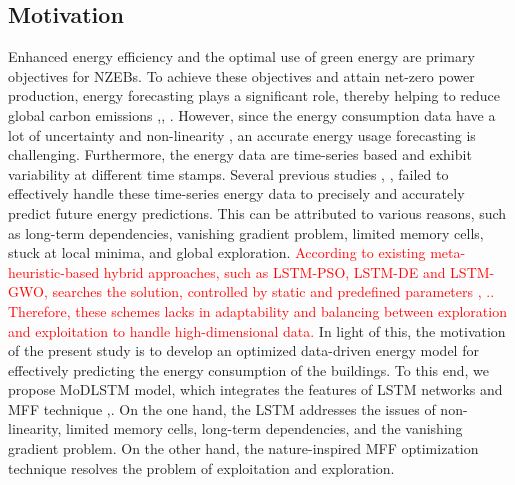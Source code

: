 \documentclass[journal]{IEEEtran}
\begin{document}
\subsection{Motivation}
Enhanced energy efficiency and the optimal use of green energy are primary objectives for NZEBs. To achieve these objectives and attain net-zero power production, energy forecasting plays a significant role, thereby helping to reduce global carbon emissions \cite{Ref2},\cite{Ref26}, \cite{Ref3}. However, 
since the energy consumption data have a lot of uncertainty and non-linearity \cite{ref16},
an accurate energy usage forecasting is challenging. Furthermore, the energy data are time-series based and exhibit variability at different time stamps. Several previous studies \cite{Ref}, \cite{Ref3}, \cite{Ref6} failed to effectively handle these time-series energy data to precisely and accurately predict future energy predictions. This can be attributed to various reasons, such as long-term dependencies, vanishing gradient problem, limited memory cells, stuck at local minima, and global exploration. \textcolor{red}{According to existing meta-heuristic-based hybrid approaches, such as LSTM-PSO, LSTM-DE and LSTM-GWO, searches the solution, controlled by static and predefined parameters \cite{RC5}, \cite{RC58}.\cite{RC55}. Therefore, these schemes lacks in adaptability and balancing between exploration and exploitation to handle high-dimensional data.} In light of this, the motivation of the present study is to develop an optimized data-driven energy model for effectively predicting the energy consumption of the buildings. To this end, we propose MoDLSTM model, which integrates the features of LSTM networks and MFF technique \cite{Ref11},\cite{Ref12}. On the one hand, the LSTM addresses the issues of non-linearity, limited memory cells, long-term dependencies, and the vanishing gradient problem. On the other hand, the nature-inspired MFF optimization technique resolves the problem of exploitation and exploration.
 
\end{document}
